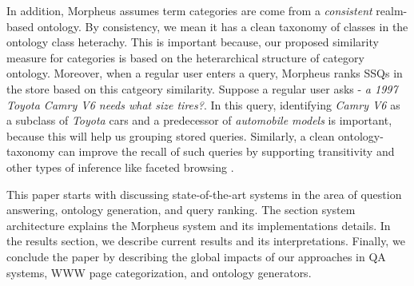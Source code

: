 In addition, Morpheus assumes term categories are come from a \textit{consistent} realm-based ontology. By consistency, we mean it has a clean taxonomy of classes in the ontology class heterachy. This is important because, our proposed similarity measure for categories is based on the heterarchical structure of category ontology. Moreover, when a regular user enters a query, Morpheus ranks SSQs in the store based on this catgeory similarity. Suppose a regular user asks -\textit{ a 1997 Toyota Camry V6 needs what size tires?}. In this query, identifying \textit{Camry V6} as a subclass of \textit{Toyota} cars and a predecessor of \textit{automobile models} is important, because this will help us grouping stored queries. Similarly, a clean ontology-taxonomy can improve the recall of such queries by supporting transitivity and other types of inference like faceted browsing \cite{Wu2008}.    

This paper starts with discussing state-of-the-art systems in the area of question answering, ontology generation, and query ranking. The section system architecture explains the Morpheus system and its implementations details. In the results section, we describe current results and its interpretations. Finally, we conclude the paper by describing the global impacts of our approaches in QA systems, WWW page categorization, and ontology generators. 
